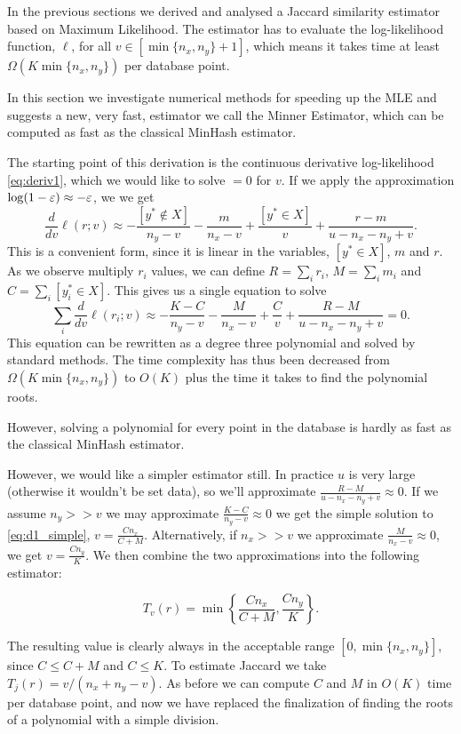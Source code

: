 In the previous sections we derived and analysed a Jaccard similarity estimator based on Maximum Likelihood.
The estimator has to evaluate the log-likelihood function, $\ell$, for all $v\in[\min\{n_x,n_y\}+1]$, which means it takes time at least $\Omega(K\min\{n_x,n_y\})$ per database point.

In this section we investigate numerical methods for speeding up the MLE and suggests a new, very fast, estimator we call the Minner Estimator, which can be computed as fast as the classical MinHash estimator.

The starting point of this derivation is the continuous derivative log-likelihood \cref{eq:deriv1},
which we would like to solve $=0$ for $v$.
If we apply the approximation $\log(1-\varepsilon) \approx -\varepsilon$,
we we get
\[
   \frac{d}{dv}\ell(r;v) \approx
   -\frac{[y^*\not\in X]}{n_y-v} 
   -\frac{m}{n_x-v} 
   +\frac{[y^*\in X]}{v} 
   +\frac{r-m}{u-n_x-n_y+v} 
   .
\]
This is a convenient form, since it is linear in the variables, $[y^*\in X]$, $m$ and $r$.
As we observe multiply $r_i$ values, we can define
$R = \sum_i r_i$, $M = \sum_i m_i$ and $C = \sum_i [y_i^*\in X]$.
This gives us a single equation to solve
\[
   \sum_i\frac{d}{dv}\ell(r_i; v) \approx
   -\frac{K-C}{n_y-v} 
   -\frac{M}{n_x-v} 
   +\frac{C}{v} 
   +\frac{R-M}{u-n_x-n_y+v} 
   = 0
   .
   \label{eq:d1_simple}
\]
This equation can be rewritten as a degree three polynomial and solved by standard methods.
The time complexity has thus been decreased from $\Omega(K\min\{n_x,n_y\})$ to $O(K)$ plus the time it takes to find the polynomial roots.

However, solving a polynomial for every point in the database is hardly as fast as the classical MinHash estimator.

However, we would like a simpler estimator still.
In practice $u$ is very large (otherwise it wouldn't be set data), so we'll approximate $\frac{R-M}{u-n_x-n_y+v}\approx 0$.
If we assume $n_y>\!>v$ we may approximate $\frac{K-C}{n_y-v}\approx 0$ we get the simple solution to \cref{eq:d1_simple}, $v=\frac{C n_x}{C+M}$.
Alternatively, if $n_x>\!>v$ we approximate $\frac{M}{n_x-v}\approx 0$, we get $v=\frac{C n_y}{K}$.
We then combine the two approximations into the following estimator:
\begin{definition}
\[
   T_v(r) = \min\left\{\frac{C n_x}{C+M}, \frac{C n_y}{K}\right\}.
   \label{eq:minner}
\]
\end{definition}

The resulting value is clearly always in the acceptable range $[0,\min\{n_x, n_y\}]$, since $C\le C+M$ and $C \le K$.
To estimate Jaccard we take $T_j(r) = v/(n_x + n_y - v)$.
As before we can compute $C$ and $M$ in $O(K)$ time per database point, and now we have replaced the finalization of finding the roots of a polynomial with a simple division.

